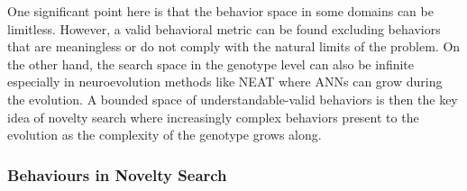 \documentclass{sig-alternate}
\begin{document}
One significant point here is that the behavior space in some domains can be limitless. However, a valid behavioral metric can be found excluding behaviors that are meaningless or do not comply with the natural limits of the problem. On the other hand, the search space in the genotype level can also be infinite especially in neuroevolution methods like NEAT where ANNs can grow during the evolution. A bounded space of understandable-valid behaviors is then the key idea of novelty search where increasingly complex behaviors present to the evolution as the complexity of the genotype grows along.

\subsubsection*{Behaviours in Novelty Search}
\end{document}

